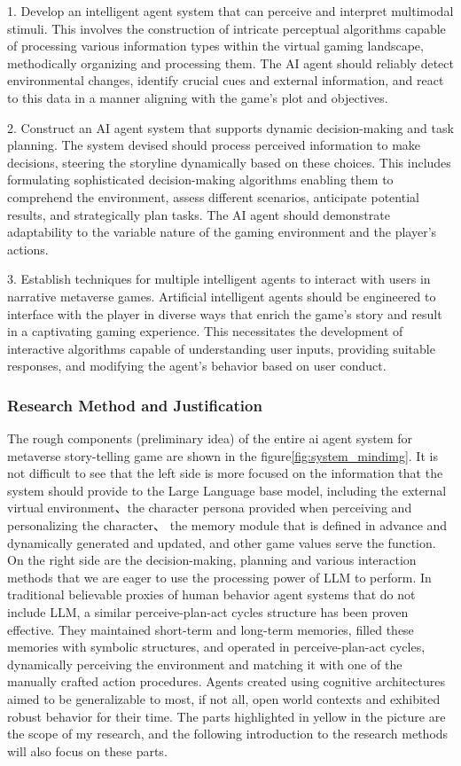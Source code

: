 1. Develop an intelligent agent system that can perceive and interpret multimodal stimuli. 
This involves the construction of intricate perceptual algorithms capable of processing various information types within the virtual gaming landscape, 
methodically organizing and processing them. The AI agent should reliably detect environmental changes, identify crucial cues and external information, 
and react to this data in a manner aligning with the game's plot and objectives.

2. Construct an AI agent system that supports dynamic decision-making and task planning. 
The system devised should process perceived information to make decisions, steering the storyline dynamically based on these choices. 
This includes formulating sophisticated decision-making algorithms enabling them to comprehend the environment, assess different scenarios, anticipate potential results, and strategically plan tasks. 
The AI agent should demonstrate adaptability to the variable nature of the gaming environment and the player's actions.

3. Establish techniques for multiple intelligent agents to interact with users in narrative metaverse games. 
Artificial intelligent agents should be engineered to interface with the player in diverse ways that enrich the game's story and result in a captivating gaming experience. 
This necessitates the development of interactive algorithms capable of understanding user inputs, providing suitable responses, and modifying the agent's behavior based on user conduct.

\subsubsection{Research Method and Justification}
The rough components (preliminary idea) of the entire ai agent system for metaverse story-telling game are shown in the figure\ref{fig:system_mindimg}. 
It is not difficult to see that the left side is more focused on the information that the system should provide to the Large Language base model, including the external virtual environment、the character persona provided when perceiving and personalizing the character、 
the memory module that is defined in advance and dynamically generated and updated, and other game values serve the function. 
On the right side are the decision-making, planning and various interaction methods that we are eager to use the processing power of LLM to perform.
In traditional believable proxies of human behavior agent systems that do not include LLM, a similar perceive-plan-act cycles structure has been proven effective.
They maintained short-term and long-term memories, filled these memories with symbolic structures, and operated in perceive-plan-act cycles, dynamically perceiving the environment and matching it with one of the manually crafted action procedures\cite{umarov2012believable}. Agents created using cognitive architectures aimed to be generalizable to most, if not all, open world contexts and exhibited robust behavior for their time.
The parts highlighted in yellow in the picture are the scope of my research, and the following introduction to the research methods will also focus on these parts.

